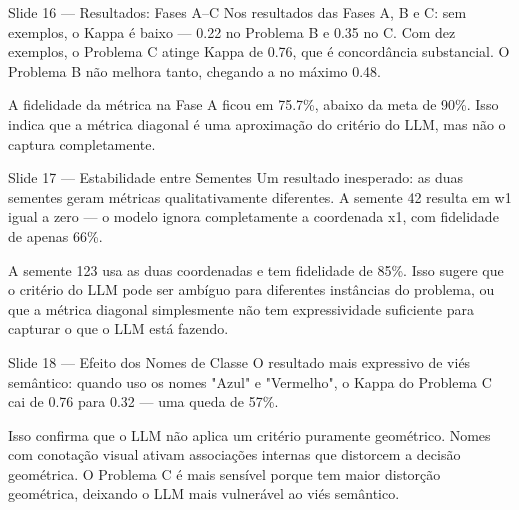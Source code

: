 \documentclass[aspectratio=169, 14pt]{beamer}
\begin{document}
\begin{frame}{Slide 16 — Resultados: Fases A–C}
  Nos resultados das Fases A, B e C: sem exemplos, o Kappa é baixo — 0.22 no Problema B e 0.35 no C. Com dez exemplos, o Problema C atinge Kappa de 0.76, que é concordância substancial. O Problema B não melhora tanto, chegando a no máximo 0.48.

  A fidelidade da métrica na Fase A ficou em 75.7\%, abaixo da meta de 90\%. Isso indica que a métrica diagonal é uma aproximação do critério do LLM, mas não o captura completamente.
\end{frame}

\begin{frame}{Slide 17 — Estabilidade entre Sementes}
  Um resultado inesperado: as duas sementes geram métricas qualitativamente diferentes. A semente 42 resulta em w1 igual a zero — o modelo ignora completamente a coordenada x1, com fidelidade de apenas 66\%.

  A semente 123 usa as duas coordenadas e tem fidelidade de 85\%. Isso sugere que o critério do LLM pode ser ambíguo para diferentes instâncias do problema, ou que a métrica diagonal simplesmente não tem expressividade suficiente para capturar o que o LLM está fazendo.
\end{frame}

\begin{frame}{Slide 18 — Efeito dos Nomes de Classe}
  O resultado mais expressivo de viés semântico: quando uso os nomes "Azul" e "Vermelho", o Kappa do Problema C cai de 0.76 para 0.32 — uma queda de 57\%.

  Isso confirma que o LLM não aplica um critério puramente geométrico. Nomes com conotação visual ativam associações internas que distorcem a decisão geométrica. O Problema C é mais sensível porque tem maior distorção geométrica, deixando o LLM mais vulnerável ao viés semântico.
\end{frame}
\end{document}
